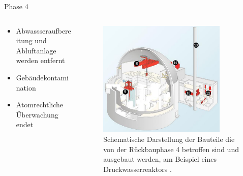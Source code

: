 \begin{frame}{Phase 4}
  \begin{columns}

    \begin{column}{0.48\textwidth}
      \begin{itemize}
        \setlength\itemsep{1.2em}
        \item{ Abwassseraufbereitung und Abluftanlage werden entfernt}
        \item{ Gebäudekontamination }
        \item{ Atomrechtliche Überwachung endet}
      \end{itemize}
    \end{column}

    \begin{column}{0.48\textwidth}
      \begin{figure}
         \centering
         \includegraphics[width=0.85\textwidth]{./bilder/abbau_phase_4_spiegel.png}
         \caption{Schematische Darstellung der Bauteile die von der Rückbauphase 4 betroffen sind und ausgebaut werden, am Beispiel eines Druckwasserreaktors \cite{abbau_grafik_stade}. }
         \label{ fig: phase_4 }
       \end{figure}
    \end{column}

  \end{columns}
\end{frame}



